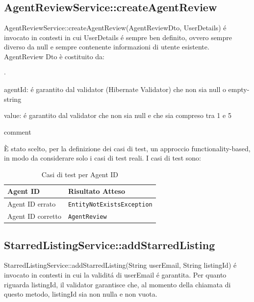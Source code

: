 \newpage

    
\subsection{AgentReviewService::createAgentReview}
AgentReviewService::createAgentReview(AgentReviewDto, UserDetails) é invocato in contesti in 
cui UserDetails é sempre ben definito, ovvero sempre diverso da null e sempre contenente 
informazioni di utente esistente.
AgentReview Dto è costituito da:
\begin{list}{$\cdot$}{}
    \item agentId: é garantito dal validator (Hibernate Validator) che non sia null o empty-string
    \item value: é garantito dal validator che non sia null e che sia compreso tra 1 e 5
    \item comment
\end{list}

È stato scelto, per la definizione dei casi di test, un approccio functionality-based, 
in modo da considerare solo i casi di test reali. I casi di test sono:
\begin{table}[h!]
    \centering
    \renewcommand{\arraystretch}{1.4}
    \begin{tabularx}{\textwidth}{|X|X|}
    \hline
    \textbf{Agent ID} & \textbf{Risultato Atteso} \\
    \hline
    Agent ID errato & \texttt{EntityNotExistsException} \\
    \hline
    Agent ID corretto & \texttt{AgentReview} \\
    \hline
    \end{tabularx}
    \caption{Casi di test per Agent ID}
\end{table}

\newpage

    
\subsection{StarredListingService::addStarredListing}
StarredListingService::addStarredListing(String userEmail, String listingId) é invocato 
in contesti in cui la validitá di userEmail é garantita. Per quanto riguarda 
listingId, il validator garantisce che, al momento della chiamata di 
questo metodo, listingId sia non nulla e non vuota.

